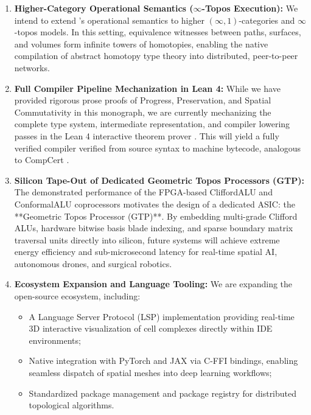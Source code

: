 \begin{enumerate}[leftmargin=1.2cm]
    \item \textbf{Higher-Category Operational Semantics ($\infty$-Topos Execution):}  
    We intend to extend \ToposLang{}'s operational semantics to higher $(\infty, 1)$-categories and $\infty$-topos models. In this setting, equivalence witnesses between paths, surfaces, and volumes form infinite towers of homotopies, enabling the native compilation of abstract homotopy type theory into distributed, peer-to-peer networks.

    \item \textbf{Full Compiler Pipeline Mechanization in Lean 4:}  
    While we have provided rigorous prose proofs of Progress, Preservation, and Spatial Commutativity in this monograph, we are currently mechanizing the complete \ToposLang{} type system, intermediate representation, and compiler lowering passes in the Lean 4 interactive theorem prover \cite{wieser2022formalizing}. This will yield a fully verified compiler verified from source syntax to machine bytecode, analogous to CompCert \cite{leroy2009formal}.

    \item \textbf{Silicon Tape-Out of Dedicated Geometric Topos Processors (GTP):}  
    The demonstrated performance of the FPGA-based CliffordALU and ConformalALU coprocessors motivates the design of a dedicated ASIC: the **Geometric Topos Processor (GTP)**. By embedding multi-grade Clifford ALUs, hardware bitwise basis blade indexing, and sparse boundary matrix traversal units directly into silicon, future systems will achieve extreme energy efficiency and sub-microsecond latency for real-time spatial AI, autonomous drones, and surgical robotics.

    \item \textbf{Ecosystem Expansion and Language Tooling:}  
    We are expanding the \ToposLang{} open-source ecosystem, including:
    \begin{itemize}
        \item A Language Server Protocol (LSP) implementation providing real-time 3D interactive visualization of cell complexes directly within IDE environments;
        \item Native integration with PyTorch and JAX via C-FFI bindings, enabling seamless dispatch of \ToposLang{} spatial meshes into deep learning workflows;
        \item Standardized package management and package registry for distributed topological algorithms.
    \end{itemize}
\end{enumerate}

